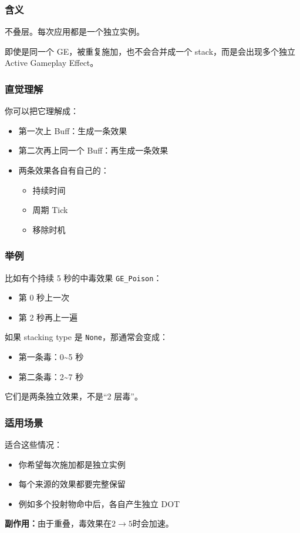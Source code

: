 \subsubsection*{含义}
不叠层。每次应用都是一个独立实例。

即使是同一个 GE，被重复施加，也不会合并成一个 stack，而是会出现多个独立 Active Gameplay Effect。

\subsubsection*{直觉理解}
你可以把它理解成：

\begin{itemize}
	\item 第一次上 Buff：生成一条效果
	\item 第二次再上同一个 Buff：再生成一条效果
	\item 两条效果各自有自己的：
	\begin{itemize}
		\item 持续时间
		\item 周期 Tick
		\item 移除时机
	\end{itemize}
\end{itemize}

\subsubsection*{举例}
比如有个持续 5 秒的中毒效果 \texttt{GE\_Poison}：

\begin{itemize}
	\item 第 0 秒上一次
	\item 第 2 秒再上一遍
\end{itemize}

如果 stacking type 是 \texttt{None}，那通常会变成：

\begin{itemize}
	\item 第一条毒：0\textasciitilde5 秒
	\item 第二条毒：2\textasciitilde7 秒
\end{itemize}

它们是两条独立效果，不是“2 层毒”。

\subsubsection*{适用场景}
适合这些情况：

\begin{itemize}
	\item 你希望每次施加都是独立实例
	\item 每个来源的效果都要完整保留
	\item 例如多个投射物命中后，各自产生独立 DOT
\end{itemize}
\textbf{副作用：}由于重叠，毒效果在$2\to 5$时会加速。
